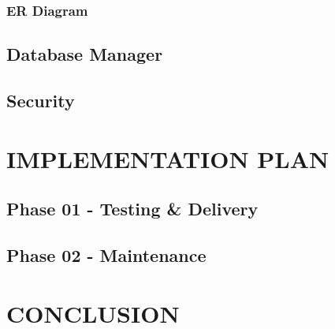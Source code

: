 \documentclass[letterpaper,11pt,2p]{elsarticle}
\begin{document}
\subsubsection{ ER Diagram}
\label{subsec1}





\subsection{ Database Manager}
\label{subsec1}





\subsection{ Security}
\label{subsec1}




\newpage 


\section{IMPLEMENTATION PLAN}



\subsection{ Phase 01 - Testing \& Delivery}
\label{subsec1}




\subsection{ Phase 02 - Maintenance}
\label{subsec1}



\newpage 

\section{CONCLUSION}
\label{subsec1}
\end{document}
